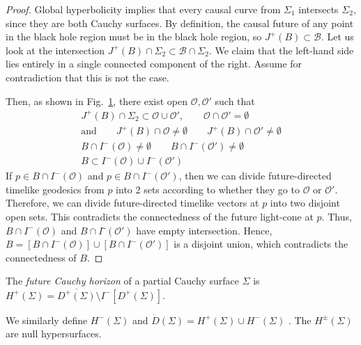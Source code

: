 
\begin{proof}
  Global hyperbolicity implies that every causal curve from $\Sigma_1$ intersects $\Sigma_2$, since they are both Cauchy surfaces.
  By definition, the causal future of any point in the black hole region must be in the black hole region, so $J^+(B) \subset \mathcal{B}$.
  Let us look at the intersection $J^+ (B) \cap \Sigma_2 \subset \mathcal{B} \cap \Sigma_2$. We claim that the left-hand side lies entirely in a single connected component of the right.
  Assume for contradiction that this is not the case.
  \begin{figure}[tbhp]
    \centering
    \def\svgwidth{0.4\columnwidth}
    
    \caption{}
    \label{fig:l13f1}
  \end{figure}
  Then, as shown in Fig.~\ref{fig:l13f1}, there exist open $\mathcal{O}, \mathcal{O}'$ such that 
  \begin{gather}
    J^+ (B) \cap \Sigma_2 \subset \mathcal{O} \cup \mathcal{O}', \qquad \mathcal{O} \cap \mathcal{O}' = \emptyset\\
    \text{and} \qquad J^+(B) \cap \mathcal{O} \neq \emptyset \qquad J^+(B) \cap \mathcal{O}' \neq \emptyset \\
    B \cap I^- (\mathcal{O}) \neq \emptyset \qquad B \cap I^-(\mathcal{O}') \neq \emptyset \\
    B \subset I^- (\mathcal{O}) \cup I^- (\mathcal{O}') \label{eq:13-star}
  \end{gather}
  If $p \in B \cap I^- (\mathcal{O})$ and $p \in B \cap I^-(\mathcal{O}')$, then we can divide future-directed timelike geodesics from $p$ into 2 sets according to whether they go to $\mathcal{O}$ or $\mathcal{O}'$.
  Therefore, we can divide future-directed timelike vectors at $p$ into two disjoint open sets.
  This contradicts the connectedness of the future light-cone at $p$.
  Thus, $B \cap I^-( \mathcal{O})$ and $B \cap I⁻ (\mathcal{O}')$ have empty intersection.
  Hence, $B = [B \cap I^-(\mathcal{O})] \cup[B \cap I^-(\mathcal{O}')]$ is a disjoint union, which contradicts the connectedness of $B$.
\end{proof}

\begin{definition}
  The \emph{future Cauchy horizon} of a partial Cauchy surface $\Sigma$ is $H^+(\Sigma) = \overline{D^+ (\Sigma)}{} \setminus I^- [D^+(\Sigma)]$.
\end{definition}
We similarly define $H^-(\Sigma)$ and $\dot{D}(\Sigma) = H^+(\Sigma) \cup H^-(\Sigma)$ .
The $H^{\pm}(\Sigma)$  are null hypersurfaces.
\begin{figure}[tbhp]
  \centering
  \def\svgwidth{0.4\columnwidth}
  
  \caption{}
  \label{fig:l13f2}
\end{figure}

